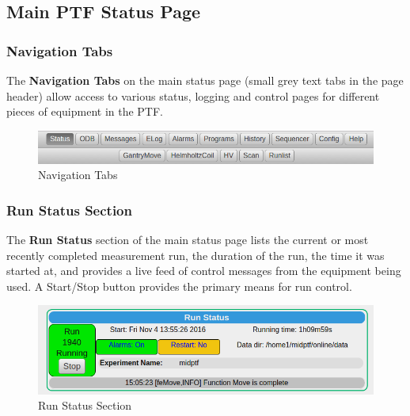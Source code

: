 \documentclass[twoside,letterpaper]{refart}
\begin{document}
\FloatBarrier

\clearpage

\subsection{Main PTF Status Page}

\subsubsection{Navigation Tabs} The \textbf{Navigation Tabs} on the main status page (small grey text tabs in the page header) allow access to various status, logging and control pages for different pieces of equipment in the PTF.

\FloatBarrier

\begin{figure}[!htpb]
	\centering	
	\includegraphics[scale=0.3]{images/navTabs.png}
	\caption{Navigation Tabs}
	\label{navTabs}	
\end{figure}

\FloatBarrier

\subsubsection{Run Status Section}

The \textbf{Run Status} section of the main status page lists the current or most recently completed measurement run, the duration of the run, the time it was started at, and provides a live feed of control messages from the equipment being used. A Start/Stop button provides the primary means for run control.

\FloatBarrier

\begin{figure}[!htpb] 
	\centering	
	\includegraphics[scale=0.3]{images/runStatus.png}
	\caption{Run Status Section}
	\label{runStatus}
\end{figure}
\end{document}
